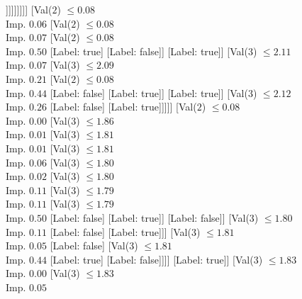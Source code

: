 \documentclass[margin=10pt]{standalone}
\begin{document}
\begin{forest}
										[Val($2$) $ \leq 0.08$ \\ Imp. $0.02$
											[Label: false]
											[Val($2$) $ \leq 0.08$ \\ Imp. $0.15$
												[Label: true]
												[Val($3$) $ \leq 2.08$ \\ Imp. $0.03$
													[Label: false]
													[Val($3$) $ \leq 2.08$ \\ Imp. $0.38$
														[Label: true]
														[Label: false]]]]]]]]]
						[Val($2$) $ \leq 0.08$ \\ Imp. $0.06$
							[Val($2$) $ \leq 0.08$ \\ Imp. $0.07$
								[Val($2$) $ \leq 0.08$ \\ Imp. $0.50$
									[Label: true]
									[Label: false]]
								[Label: true]]
							[Val($3$) $ \leq 2.11$ \\ Imp. $0.07$
								[Val($3$) $ \leq 2.09$ \\ Imp. $0.21$
									[Val($2$) $ \leq 0.08$ \\ Imp. $0.44$
										[Label: false]
										[Label: true]]
									[Label: true]]
								[Val($3$) $ \leq 2.12$ \\ Imp. $0.26$
									[Label: false]
									[Label: true]]]]]
					[Val($2$) $ \leq 0.08$ \\ Imp. $0.00$
						[Val($3$) $ \leq 1.86$ \\ Imp. $0.01$
							[Val($3$) $ \leq 1.81$ \\ Imp. $0.01$
								[Val($3$) $ \leq 1.81$ \\ Imp. $0.06$
									[Val($3$) $ \leq 1.80$ \\ Imp. $0.02$
										[Val($3$) $ \leq 1.80$ \\ Imp. $0.11$
											[Val($3$) $ \leq 1.79$ \\ Imp. $0.11$
												[Val($3$) $ \leq 1.79$ \\ Imp. $0.50$
													[Label: false]
													[Label: true]]
												[Label: false]]
											[Val($3$) $ \leq 1.80$ \\ Imp. $0.11$
												[Label: false]
												[Label: true]]]
										[Val($3$) $ \leq 1.81$ \\ Imp. $0.05$
											[Label: false]
											[Val($3$) $ \leq 1.81$ \\ Imp. $0.44$
												[Label: true]
												[Label: false]]]]
									[Label: true]]
								[Val($3$) $ \leq 1.83$ \\ Imp. $0.00$
									[Val($3$) $ \leq 1.83$ \\ Imp. $0.05$

\end{forest}
\end{document}
